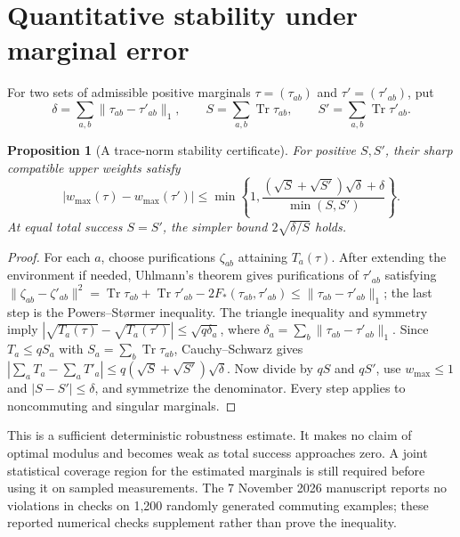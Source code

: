 \documentclass[10pt,letterpaper]{article}
\newtheorem{proposition}[theorem]{Proposition}
\newcommand{\Tr}{\operatorname{Tr}}
\begin{document}
\section{Quantitative stability under marginal error}
For two sets of admissible positive marginals $\tau=(\tau_{ab})$ and $\tau'=(\tau'_{ab})$, put
\[
\delta=\sum_{a,b}\|\tau_{ab}-\tau'_{ab}\|_1,\qquad S=\sum_{a,b}\Tr\tau_{ab},\qquad S'=\sum_{a,b}\Tr\tau'_{ab}.
\]
\begin{proposition}[A trace-norm stability certificate]
For positive $S,S'$, their sharp compatible upper weights satisfy
\[
\boxed{|w_{\max}(\tau)-w_{\max}(\tau')|\le\min\left\{1,\frac{(\sqrt S+\sqrt{S'})\sqrt\delta+\delta}{\min(S,S')}\right\}.}
\]
At equal total success $S=S'$, the simpler bound $2\sqrt{\delta/S}$ holds.
\end{proposition}
\begin{proof}
For each $a$, choose purifications $\zeta_{ab}$ attaining $T_a(\tau)$. After extending the environment if needed, Uhlmann's theorem gives purifications of $\tau'_{ab}$ satisfying
$\|\zeta_{ab}-\zeta'_{ab}\|^2=\Tr\tau_{ab}+\Tr\tau'_{ab}-2F_*(\tau_{ab},\tau'_{ab})\le\|\tau_{ab}-\tau'_{ab}\|_1$; the last step is the Powers--St\o rmer inequality. The triangle inequality and symmetry imply
$|\sqrt{T_a(\tau)}-\sqrt{T_a(\tau')}|\le\sqrt{q\delta_a}$, where $\delta_a=\sum_b\|\tau_{ab}-\tau'_{ab}\|_1$.
Since $T_a\le qS_a$ with $S_a=\sum_b\Tr\tau_{ab}$, Cauchy--Schwarz gives
$|\sum_a T_a-\sum_aT'_a|\le q(\sqrt S+\sqrt{S'})\sqrt\delta$. Now divide by $qS$ and $qS'$, use $w_{\max}\le1$ and $|S-S'|\le\delta$, and symmetrize the denominator. Every step applies to noncommuting and singular marginals.
\end{proof}
This is a sufficient deterministic robustness estimate. It makes no claim of optimal modulus and becomes weak as total success approaches zero. A joint statistical coverage region for the estimated marginals is still required before using it on sampled measurements. The 7 November 2026 manuscript reports no violations in checks on 1,200 randomly generated commuting examples; these reported numerical checks supplement rather than prove the inequality.
\end{document}

